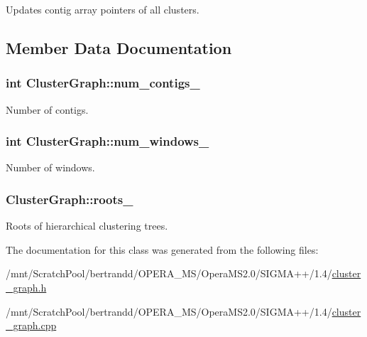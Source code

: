 Updates contig array pointers of all clusters. 

\subsection{Member Data Documentation}
\hypertarget{classClusterGraph_a9d5062c556485d3ca77c2fc270ef1938}{
\subsubsection[{num\_\-contigs\_\-}]{\setlength{\rightskip}{0pt plus 5cm}int {\bf ClusterGraph::num\_\-contigs\_\-}}}
\label{classClusterGraph_a9d5062c556485d3ca77c2fc270ef1938}
Number of contigs. \hypertarget{classClusterGraph_ae52fec62b35dad39bd1cb757a2ff7add}{
\subsubsection[{num\_\-windows\_\-}]{\setlength{\rightskip}{0pt plus 5cm}int {\bf ClusterGraph::num\_\-windows\_\-}}}
\label{classClusterGraph_ae52fec62b35dad39bd1cb757a2ff7add}
Number of windows. \hypertarget{classClusterGraph_abbf63d74cafd0b69804e3ce316efa784}{
\subsubsection[{roots\_\-}]{ {\bf ClusterGraph::roots\_\-}}}
\label{classClusterGraph_abbf63d74cafd0b69804e3ce316efa784}
Roots of hierarchical clustering trees. 

The documentation for this class was generated from the following files:\begin{DoxyCompactItemize}
\item 
/mnt/ScratchPool/bertrandd/OPERA\_\-MS/OperaMS2.0/SIGMA++/1.4/\hyperlink{cluster__graph_8h}{cluster\_\-graph.h}\item 
/mnt/ScratchPool/bertrandd/OPERA\_\-MS/OperaMS2.0/SIGMA++/1.4/\hyperlink{cluster__graph_8cpp}{cluster\_\-graph.cpp}\end{DoxyCompactItemize}
